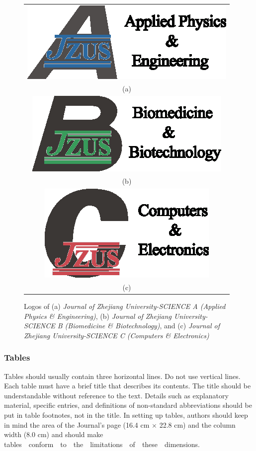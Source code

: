 \documentclass[twoside,twocolumn]{article}
\begin{document}
\begin{figure}[!htb]\small
\centering
\begin{tabular}{c}
\includegraphics{pics/jzusalogo.eps}\\
(a)\\[3mm]
\includegraphics{pics/jzusblogo.eps}\\
(b)\\
\includegraphics{pics/jzusclogo.eps}\\
(c)\\
\end{tabular}
\caption{Logos of (a) \emph{Journal of Zhejiang University-SCIENCE A (Applied Physics {\sf \slshape \&} Engineering)}, (b) \emph{Journal of Zhejiang University-SCIENCE B (Biomedicine {\sf \slshape \&} Biotechnology)}, and (c) \emph{Journal of Zhejiang University-SCIENCE C (Computers {\sf \slshape \&} Electronics)}}
\label{fig:logo}
\end{figure}


\subsubsection{Tables}\label{sec:table}

Tables should usually contain three horizontal lines. Do not use vertical lines. Each table must have a brief title that describes its contents. The title should be understandable without reference to the text. Details such as explanatory material, specific entries, and definitions of non-standard abbreviations should be put in table footnotes, not in the title. In setting up tables, authors should keep in mind the area of the Journal's page (16.4 cm $\times$ 22.8 cm) and the column width (8.0 cm) and should make tables\ \ conform\ \ to\ \ the\ \ limitations\ \ of\ \ these\ \ dimensions.
\end{document}
